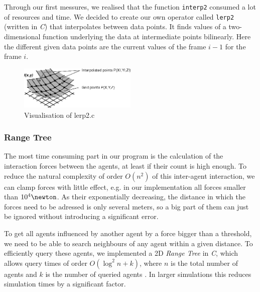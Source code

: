 \documentclass[11pt]{article}
\begin{document}
Through our first messures, we realised that the function \verb+interp2+
consumed a lot of resources and time. We decided to create our own operator
called \verb+lerp2+ (written in \textit{C}) that interpolates between data points. It finds values of a
two-dimensional function underlying the data at intermediate points bilinearly.
Here the different given data points are the current values of the frame $i-1$
for the frame $i$. 

\begin{figure}[h]
\centering
\includegraphics[width=0.5\textwidth]{./images/lerp2.png}
\caption{Visualisation of lerp2.c} 
\label{lerp2 image}
\end{figure}


\subsubsection{Range Tree}
The most time consuming part in our program is the calculation of the interaction
forces between the agents, at least if their count is high enough. To reduce the
natural complexity of order $O(n^{2})$ of this inter-agent interaction, we can clamp forces
with little effect, e.g. in our implementation all forces smaller than $ 10^{4}\newton$.
As their exponentially decreasing, the distance in which the forces need to be adressed
is only several meters, so a big part of them can just be ignored without introducing 
a significant error.

To get all agents influenced by another agent by a force bigger than a threshold, we need to be able
to search neighbours of any agent within a given distance. To efficiently query 
these agents, we implemented a 2D \textit{Range Tree} in \textit{C}, which allows query times
of order $O(\log^{2} n+k)$, where $n$ is the total number of agents and $k$ is the number of
queried agents \cite{algdat}. In larger simulations this reduces simulation times by a significant factor.
\end{document}
